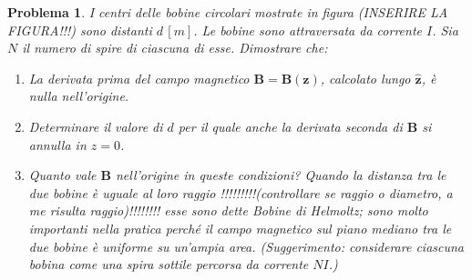\documentclass[a4paper,oneside]{article}
\newtheorem{problema}{Problema}
\renewcommand{\vec}[1]{\mathbf{#1}}
\renewcommand{\hat}[1]{\widehat{\mathbf{#1}}}
\begin{document}
\begin{problema}
	I centri delle bobine circolari mostrate in figura (INSERIRE LA FIGURA!!!)
	sono distanti $d\,[m]$. 
	Le bobine sono attraversata da corrente $I$. Sia $N$ il numero di spire di ciascuna di esse. 
	Dimostrare che:
	\begin{enumerate}
		\item La derivata prima del campo magnetico $\vec{B} = \vec{B(z)}$, 
		calcolato lungo $\hat{z}$, è nulla nell'origine.
		\item Determinare il valore di $d$ per il quale anche la 
		derivata seconda di $\vec{B}$ si annulla in $z = 0$.
		\item Quanto vale $\vec{B}$ nell'origine in queste condizioni?
		Quando la distanza tra le due bobine è uguale al loro raggio 
		!!!!!!!!!(controllare se raggio o diametro, a me risulta raggio)!!!!!!!! 
		esse sono dette Bobine di Helmoltz; sono molto importanti 
		nella pratica perché 
		il campo magnetico sul piano
		mediano tra le due bobine è uniforme su un'ampia area.
		(Suggerimento: considerare ciascuna bobina come 
		una spira sottile percorsa da corrente $NI$.)
	\end{enumerate}
\end{problema}
\end{document}
